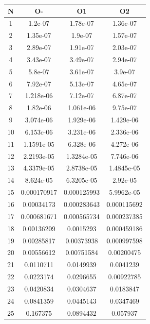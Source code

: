 \begin{center}
\begin{tabular}{| c | c | c | c |}
\hline
\textbf{N} & \textbf{O-} & \textbf{O1} & \textbf{O2} \\ \hline
1 & 1.2e-07 & 1.78e-07 & 1.36e-07 \\ \hline
2 & 1.35e-07 & 1.9e-07 & 1.57e-07 \\ \hline
3 & 2.89e-07 & 1.91e-07 & 2.03e-07 \\ \hline
4 & 3.43e-07 & 3.49e-07 & 2.94e-07 \\ \hline
5 & 5.8e-07 & 3.61e-07 & 3.9e-07 \\ \hline
6 & 7.92e-07 & 5.13e-07 & 4.65e-07 \\ \hline
7 & 1.218e-06 & 7.12e-07 & 6.87e-07 \\ \hline
8 & 1.82e-06 & 1.061e-06 & 9.75e-07 \\ \hline
9 & 3.074e-06 & 1.929e-06 & 1.429e-06 \\ \hline
10 & 6.153e-06 & 3.231e-06 & 2.336e-06 \\ \hline
11 & 1.1591e-05 & 6.328e-06 & 4.272e-06 \\ \hline
12 & 2.2193e-05 & 1.3284e-05 & 7.746e-06 \\ \hline
13 & 4.3379e-05 & 2.8738e-05 & 1.4845e-05 \\ \hline
14 & 8.624e-05 & 6.3205e-05 & 2.92e-05 \\ \hline
15 & 0.000170917 & 0.000125993 & 5.9962e-05 \\ \hline
16 & 0.00034173 & 0.000283643 & 0.000115692 \\ \hline
17 & 0.000681671 & 0.000565734 & 0.000237385 \\ \hline
18 & 0.00136209 & 0.0015293 & 0.000459186 \\ \hline
19 & 0.00285817 & 0.00373938 & 0.000997598 \\ \hline
20 & 0.00556612 & 0.00751584 & 0.00200475 \\ \hline
21 & 0.0110711 & 0.0149939 & 0.0041239 \\ \hline
22 & 0.0223174 & 0.0296655 & 0.00922785 \\ \hline
23 & 0.0420834 & 0.0304637 & 0.0183847 \\ \hline
24 & 0.0841359 & 0.0445143 & 0.0347469 \\ \hline
25 & 0.167375 & 0.0894432 & 0.057937 \\ \hline
\hline
\end{tabular}
\end{center}
